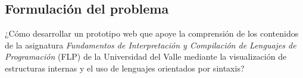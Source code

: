 \subsection{Formulación del problema}
¿Cómo desarrollar un prototipo web que apoye la comprensión de los contenidos de la asignatura \textit{Fundamentos de Interpretación y Compilación de Lenguajes de Programación} (FLP) de la Universidad del Valle mediante la visualización de estructuras internas y el uso de lenguajes orientados por sintaxis?